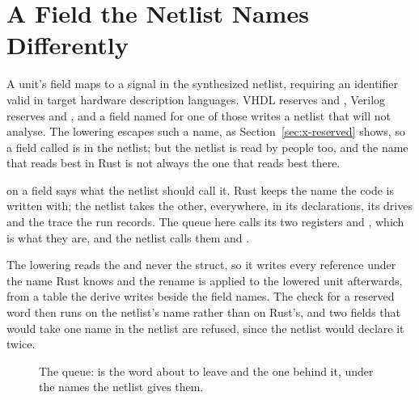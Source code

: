 \section{A Field the Netlist Names Differently}
\label{sec:x-rename}

A unit's field maps to a signal in the synthesized netlist, requiring
an identifier valid in target hardware description languages. VHDL reserves
 and , Verilog reserves  and ,
and a field named for one of those writes a netlist that will not analyse.
The lowering escapes such a name, as Section~\ref{sec:x-reserved}
shows, so a field called  is  in the
netlist; but the netlist is read by people too, and the name that
reads best in Rust is not always the one that reads best there.

\code{\#[rename("...")]} on a field says what the netlist should call
it. Rust keeps the name the code is written with; the netlist takes
the other, everywhere, in its declarations, its drives and the trace
the run records. The queue here calls its two registers 
and , which is what they are, and the netlist calls them
 and .

The lowering reads the  and never the struct, so it writes
every reference under the name Rust knows and the rename is applied
to the lowered unit afterwards, from a table the derive writes beside
the field names. The check for a reserved word then runs on the
netlist's name rather than on Rust's, and two fields that would take
one name in the netlist are refused, since the netlist would declare
it twice.

\begin{figure}[htbp]
\centering

\caption{The queue:  is the word about to leave and
 the one behind it, under the names the netlist gives
them.}
\label{fig:x-rename}
\end{figure}





